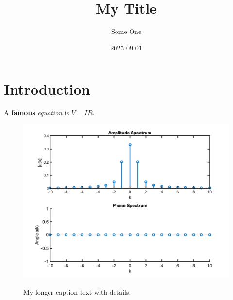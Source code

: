 \documentclass{article}
\title{My Title}
\author{Some One}
\date{2025-09-01}
\begin{document}
\maketitle

\section{Introduction}

A \textbf{famous} \textit{equation} is $V = IR$.

\begin{figure}
  \centering
    \includegraphics[alt={illustration of concept X, 
                        see figure caption for details
						}]{myfig.png}
  \caption{My longer caption text with details.}
\end{figure}
\end{document}
